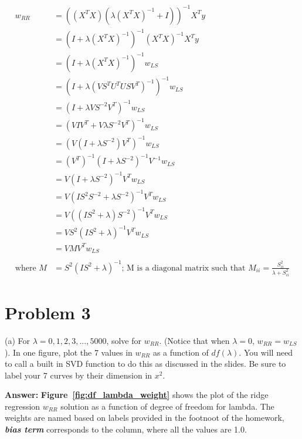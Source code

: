 \documentclass[11pt]{report}
\begin{document}
\begin{equation*}
\begin{split}
w_{RR} &= ((X^TX) (\lambda (X^TX)^{-1} + I))^{-1} X^T y \\
&= (I + \lambda (X^TX)^{-1})^{-1} (X^TX)^{-1} X^T y \\
&= (I + \lambda (X^TX)^{-1})^{-1} w_{LS} \\
&= (I + \lambda (V S^T U^T U S V^T)^{-1})^{-1} w_{LS} \\
&= (I + \lambda V S^{-2} V^T)^{-1} w_{LS} \\
&= (V I V^T + V \lambda S^{-2} V^T)^{-1} w_{LS} \\
&= (V (I + \lambda S^{-2}) V^T )^{-1} w_{LS} \\
&= (V^T)^{-1} (I + \lambda S^{-2})^{-1} V^{-1}  w_{LS} \\
&= V (I + \lambda S^{-2})^{-1} V^T  w_{LS} \\
&= V (I S^{2} S^{-2} + \lambda S^{-2})^{-1} V^T  w_{LS} \\
&= V ((I S^{2} + \lambda) S^{-2})^{-1} V^T  w_{LS} \\
&= V S^{2} (I S^{2} + \lambda)^{-1} V^T  w_{LS} \\
&= V M V^T  w_{LS} \\
\\
\text{where } M& =  S^{2} (I S^{2} + \lambda)^{-1} \text{; M is a diagonal matrix such that } M_{ii} = \frac{S_{ii}^2}{\lambda + S_{ii} ^ 2}
\end{split} 
\end{equation*}

\pagebreak

\section{Problem 3}
(a) For $\lambda = 0, 1, 2 ,3, ..., 5000$, solve for $w_{RR}$. (Notice that when $\lambda = 0$, $w_{RR} = w_{LS}$). In one figure, plot the 7 values in $w_{RR}$ as a function of $df(\lambda)$. You will need to call a built in SVD function to do this as discussed in the slides. Be sure to label your 7 curves by their dimension in ${x^2}$.

\justify
\textbf{Answer:} \textbf{Figure~\ref{fig:df_lambda_weight}}  shows the plot of the ridge regression $w_{RR}$ solution as a function of degree of freedom for lambda. The weights are named based on labels provided in the footnoot of the homework, \emph{\textbf{bias term}} corresponds to the column, where all the values are 1.0. 
\end{document}
